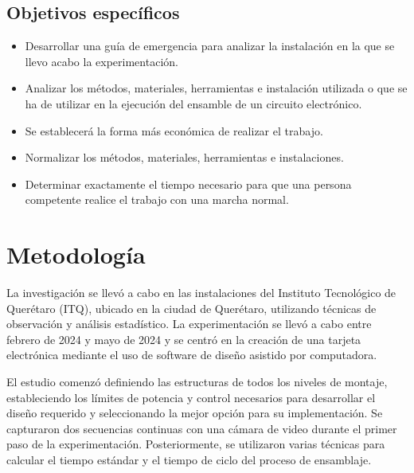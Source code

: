 \subsection{Objetivos específicos }


% 
% 
\begin{itemize}
    \item Desarrollar una guía de emergencia para analizar la instalación en la que se llevo acabo la experimentación.
    \item Analizar los métodos, materiales, herramientas e instalación utilizada o que se ha de utilizar en la ejecución del ensamble de un circuito electrónico.
    \item Se establecerá la forma más económica de realizar el trabajo.
    \item Normalizar los métodos, materiales, herramientas e instalaciones.
    \item Determinar exactamente el tiempo necesario para que una persona competente realice el trabajo con una marcha normal.
\end{itemize}
% 
% 
\section{Metodología}

La investigación se llevó a cabo en las instalaciones del Instituto Tecnológico de Querétaro (ITQ), ubicado en la ciudad de Querétaro, utilizando técnicas de observación y análisis estadístico. La experimentación se llevó a cabo entre febrero de 2024 y mayo de 2024 y se centró en la creación de una tarjeta electrónica mediante el uso de software de diseño asistido por computadora.

El estudio comenzó definiendo las estructuras de todos los niveles de montaje, estableciendo los límites de potencia y control necesarios para desarrollar el diseño requerido y seleccionando la mejor opción para su implementación. Se capturaron dos secuencias continuas con una cámara de video durante el primer paso de la experimentación. Posteriormente, se utilizaron varias técnicas para calcular el tiempo estándar y el tiempo de ciclo del proceso de ensamblaje.

